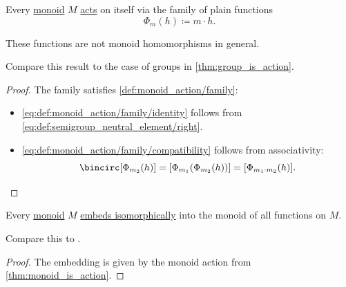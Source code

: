 \begin{proposition}\label{thm:monoid_is_action}
  Every \hyperref[def:monoid]{monoid} \( M \) \hyperref[def:monoid_action]{acts} on itself via the family of plain functions
  \begin{equation*}
    \Phi_m(h) \coloneqq m \cdot h.
  \end{equation*}
\end{proposition}
\begin{comments}
  \item These functions are not monoid homomorphisms in general.
  \item Compare this result to the case of groups in \cref{thm:group_is_action}.
\end{comments}
\begin{proof}
  The family satisfies \cref{def:monoid_action/family}:
  \begin{itemize}
    \item \ref{eq:def:monoid_action/family/identity} follows from \eqref{eq:def:semigroup_neutral_element/right}.

    \item \ref{eq:def:monoid_action/family/compatibility} follows from associativity:
    \begin{equation*}
      [\Phi_{m_1}(h)] \bincirc [\Phi_{m_2}(h)] = [\Phi_{m_1}(\Phi_{m_2}(h))] = [\Phi_{m_1 \cdot m_2}(h)].
    \end{equation*}
  \end{itemize}
\end{proof}

\begin{theorem}\label{thm:cayleys_theorem_for_monoids}
  Every \hyperref[def:monoid]{monoid} \( M \) \hyperref[def:fol_embedding]{embeds isomorphically} into the monoid of all functions on \( M \).
\end{theorem}
\begin{comments}
  \item Compare this to .
\end{comments}
\begin{proof}
  The embedding is given by the monoid action from \cref{thm:monoid_is_action}.
\end{proof}

